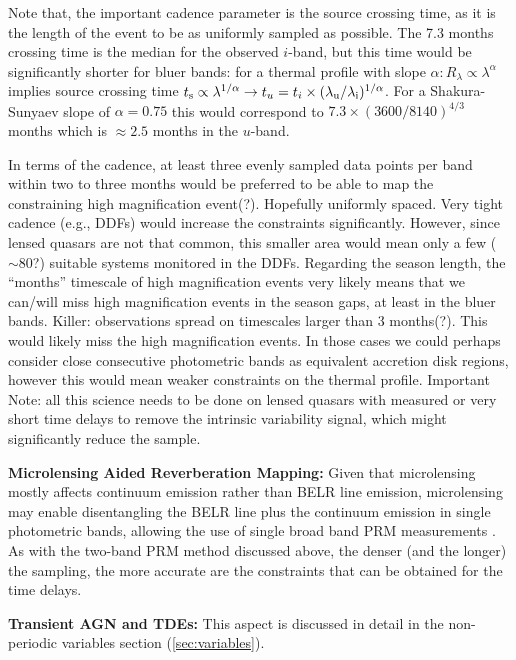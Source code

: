 Note that, the important cadence parameter is the source crossing time,
as it is the length of the event to be as uniformly sampled as
possible. The 7.3 months crossing time is the median for the observed
$i$-band, but this time would be significantly shorter for bluer bands:
for a thermal profile with slope
$\alpha: R_\lambda \propto \lambda^\alpha$ implies source crossing time
$t_{\rm s} \propto \lambda^{1/\alpha} \rightarrow
t_u=t_i \times (\lambda_{\rm u} / \lambda_{\rm i})^{1/\alpha}$. For a
Shakura-Sunyaev slope of $\alpha=0.75$ this would correspond to
$7.3 \times (3600/8140)^{4/3}$ months which is $\approx 2.5$ months in
the $u$-band.

In terms of the cadence, at least three evenly sampled data points per
band within two to three months would be preferred to be able to map
the constraining high magnification event(?). Hopefully uniformly
spaced. Very tight cadence (e.g., DDFs) would increase the constraints
significantly. However, since lensed quasars are not that common, this
smaller area would mean only a few ($\sim80$?) suitable systems
monitored in the DDFs.
%
Regarding the season length, the ``months'' timescale of high
magnification events very likely means that we can/will miss high
magnification events in the season gaps, at least in the bluer bands.
%
Killer: observations spread on timescales larger than 3 months(?).
This would likely miss the high magnification events. In those cases
we could perhaps consider close consecutive photometric bands as
equivalent accretion disk regions, however this would mean weaker
constraints on the thermal profile.
%
Important Note: all this science needs to be done on lensed quasars
with measured or very short time delays to remove the intrinsic
variability signal, which might significantly reduce the sample.

{\bf Microlensing Aided Reverberation Mapping:} Given that
microlensing mostly affects continuum emission rather than BELR line
emission, microlensing may enable disentangling the BELR line plus the
continuum emission in single photometric bands, allowing the use of
single broad band PRM measurements \citep{SluseandTewes2014}. As with
the two-band PRM method discussed above, the denser (and the longer)
the sampling, the more accurate are the constraints that can be
obtained for the time delays.

{\bf Transient AGN and TDEs:} This aspect is discussed in detail in
the non-periodic variables section (\autoref{sec:variables}).


